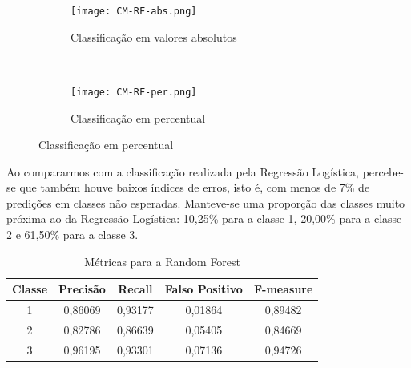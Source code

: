 \begin{figure}[!ht]
    \centering
        \caption{Resultados da clusterização da Random Forest}
    \begin{subfigure}[t]{0.45\textwidth}
        \centering
\texttt{[image: CM-RF-abs.png]}

        \caption{Classificação em valores absolutos}
    \end{subfigure}%
    ~ 
    \begin{subfigure}[t]{0.45\textwidth}
        \centering
        \texttt{[image: CM-RF-per.png]}
        \caption{Classificação em percentual}
    \end{subfigure}

\end{figure}

Ao compararmos com a classificação realizada pela Regressão Logística, percebe-se que também houve baixos índices de erros, isto é, com menos de 7\% de predições em classes não esperadas. Manteve-se uma proporção das classes muito próxima ao da Regressão Logística: 10,25\% para a classe 1, 20,00\% para a classe 2 e 61,50\% para a classe 3.



\begin{table}[!ht]
  \caption{Métricas para a Random Forest}
  \centering
  \begin{tabular}{ c c c c c } \toprule
  Classe & Precisão & Recall  & Falso Positivo & F-measure  \\\midrule
        1    & 0,86069  & 0,93177 & 0,01864        & 0,89482    \\
    2    & 0,82786  & 0,86639 & 0,05405        & 0,84669    \\
    3    & 0,96195  & 0,93301 & 0,07136        & 0,94726 \\\bottomrule
\end{tabular}
\end{table}




